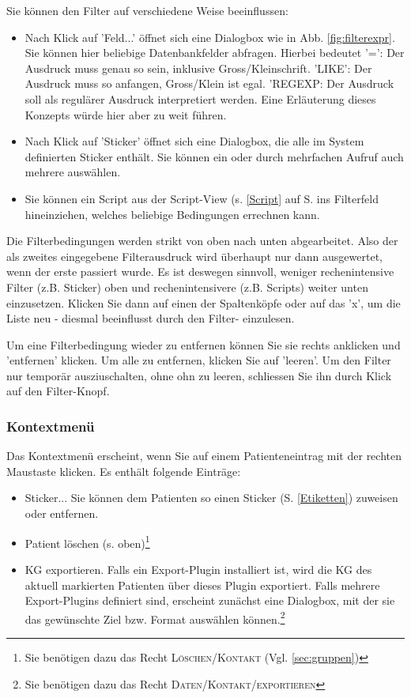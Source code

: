 Sie können den Filter auf verschiedene Weise beeinflussen:
\begin{itemize}
\item Nach Klick auf 'Feld...' öffnet sich eine Dialogbox wie in Abb. \ref{fig:filterexpr}. Sie können hier beliebige Datenbankfelder abfragen. Hierbei bedeutet '=': Der Ausdruck muss genau so sein, inklusive Gross/Kleinschrift. 'LIKE': Der Ausdruck muss so anfangen, Gross/Klein ist egal. 'REGEXP: Der Ausdruck soll als regulärer Ausdruck interpretiert werden. Eine Erläuterung dieses Konzepts würde hier aber zu weit führen.
\item Nach Klick auf 'Sticker' öffnet sich eine Dialogbox, die alle im System definierten Sticker enthält. Sie können ein oder durch mehrfachen Aufruf auch mehrere auswählen.
\item Sie können ein Script aus der Script-View (s. \ref{Script} auf S. \pageref{Script} ins Filterfeld hineinziehen, welches beliebige Bedingungen errechnen kann.
\end{itemize}

Die Filterbedingungen werden strikt von oben nach unten abgearbeitet. Also der als zweites eingegebene Filterausdruck wird überhaupt nur dann ausgewertet, wenn der erste passiert wurde. Es ist deswegen sinnvoll, weniger rechenintensive Filter (z.B. Sticker) oben und rechenintensivere (z.B. Scripts) weiter unten einzusetzen.
Klicken Sie dann auf einen der Spaltenköpfe oder auf das 'x', um die Liste neu - diesmal beeinflusst durch den Filter- einzulesen.

\medskip

Um eine Filterbedingung wieder zu entfernen können Sie sie rechts anklicken  und 'entfernen' klicken. Um alle zu entfernen, klicken Sie auf 'leeren'. Um den Filter nur temporär ausziuschalten, ohne ohn zu leeren, schliessen Sie ihn durch Klick auf den Filter-Knopf.


\subsubsection{Kontextmenü}
Das Kontextmenü erscheint, wenn Sie auf einem Pa\-tien\-ten\-eintrag mit der rech\-ten
Maus\-taste klicken. Es enthält fol\-gende Ein\-träge:
\begin{itemize}
    \item Sticker... Sie können dem Patienten so einen Sticker (S. \ref{Etiketten}) zuweisen oder entfernen.
  \item Patient löschen (s. oben)\footnote{Sie benötigen dazu das Recht \textsc{Löschen/Kontakt} (Vgl. \ref{sec:gruppen})}
  \item KG exportieren. Falls ein Export-Plugin installiert ist, wird die KG des
  aktuell markierten Patienten über dieses Plugin exportiert. Falls mehrere
  Export-Plugins definiert sind, erscheint zunächst eine Dialogbox, mit der sie
  das ge\-wünschte Ziel bzw. Format auswählen können.\footnote{Sie benötigen dazu das Recht \textsc{Daten/Kontakt/exportieren}}
\end{itemize}


